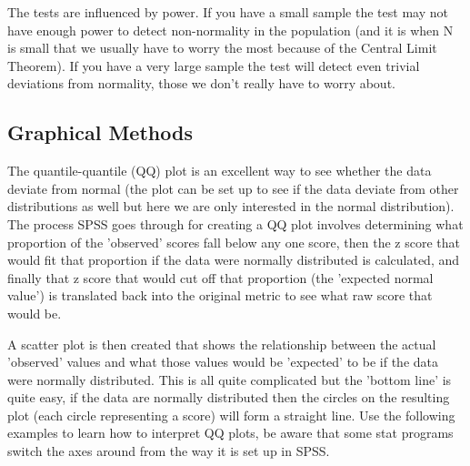 \documentclass[french]{article}
\begin{document}
The tests are influenced by power. If you have a small sample the test may not have enough power to detect non-normality in the population (and it is when N is small that we usually have to worry the most because of the Central Limit Theorem). If you have a very large sample the test will detect even trivial deviations from normality, those we don't really have to worry about.
 
\subsection{Graphical Methods}

The quantile-quantile (QQ) plot is an excellent way to see whether the data deviate from normal (the plot can be set up to see if the data deviate from other distributions as well but here we are only interested in the normal distribution). The process SPSS goes through for creating a QQ plot involves determining what proportion of the 'observed' scores fall below any one score, then the z score that would fit that proportion if the data were normally distributed is calculated, and finally that z score that would cut off that proportion (the 'expected normal value') is translated back into the original metric to see what raw score that would be. 

A scatter plot is then created that shows the relationship between the actual 'observed' values and what those values would be 'expected' to be if the data were normally distributed. This is all quite complicated but the 'bottom line' is quite easy, if the data are normally distributed then the circles on the resulting plot (each circle representing a score) will form a straight line. Use the following examples to learn how to interpret QQ plots, be aware that some stat programs switch the axes around from the way it is set up in SPSS.
\end{document}
